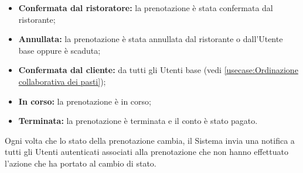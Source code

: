\begin{itemize}
\begin{itemize}
\begin{itemize}
			            \item \textbf{Confermata dal ristoratore:} la prenotazione è
			                  stata confermata dal ristorante;

			            \item \textbf{Annullata:} la prenotazione è
			                  stata annullata dal ristorante o dall'Utente base
			                  oppure è scaduta;

			            \item \textbf{Confermata dal cliente:} da tutti gli
			                  Utenti base (vedi
			                  \autoref{usecase:Ordinazione collaborativa dei pasti});

			            \item \textbf{In corso:} la prenotazione è
			                  in corso;

			            \item \textbf{Terminata:} la prenotazione è
			                  terminata e il conto è stato pagato.
		            \end{itemize}

		            Ogni volta che lo stato della prenotazione cambia, il Sistema
		            invia una notifica a tutti gli Utenti autenticati associati alla
		            prenotazione che non hanno effettuato l'azione che ha portato al
		            cambio di stato.
	      \end{itemize}

\end{itemize}
